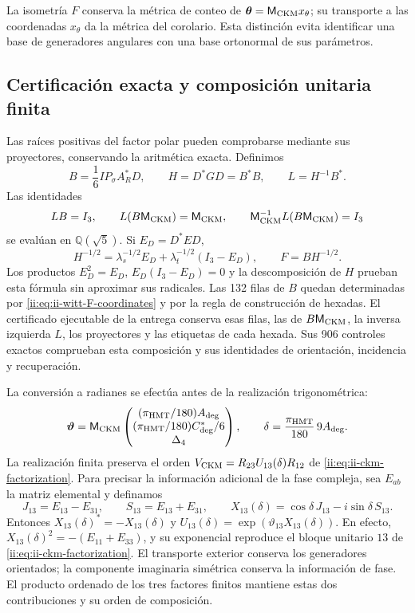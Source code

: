 La isometría \(F\) conserva la métrica de conteo de
\(\boldsymbol\theta=\mathsf M_{\rm CKM}x_\theta\); su transporte
a las coordenadas \(x_\theta\) da la métrica del corolario. Esta
distinción evita identificar una base de generadores angulares con una
base ortonormal de sus parámetros.

\subsection{Certificación exacta y composición unitaria finita}

Las raíces positivas del factor polar pueden comprobarse mediante sus
proyectores, conservando la aritmética exacta. Definimos
\begin{equation}
 B=\frac16IP_\sigma A_R^*D,\qquad
 H=D^*GD=B^*B,\qquad L=H^{-1}B^*.
 \label{ii:eq:ii-witt-radical-free}
\end{equation}
Las identidades
\[
 LB=I_3,\qquad L(B\mathsf M_{\rm CKM})=\mathsf M_{\rm CKM},\qquad
 \mathsf M_{\rm CKM}^{-1}L(B\mathsf M_{\rm CKM})=I_3
\]
se evalúan en \(\mathbb Q(\sqrt5)\). Si \(E_D=D^*ED\),
\[
 H^{-1/2}=\lambda_s^{-1/2}E_D+
          \lambda_t^{-1/2}(I_3-E_D),\qquad F=BH^{-1/2}.
\]
Los productos \(E_D^2=E_D\), \(E_D(I_3-E_D)=0\) y la
descomposición de \(H\) prueban esta fórmula sin aproximar sus
radicales. Las 132 filas de \(B\) quedan determinadas por
\eqref{ii:eq:ii-witt-F-coordinates} y por la regla de construcción de
hexadas. El certificado ejecutable de la entrega conserva esas filas,
las de \(B\mathsf M_{\rm CKM}\), la inversa izquierda \(L\),
los proyectores y las etiquetas de cada hexada. Sus 906 controles
exactos comprueban esta composición y sus identidades de orientación,
incidencia y recuperación.

La conversión a radianes se efectúa antes de la realización trigonométrica:
\begin{equation}
 \boldsymbol\vartheta=
 \mathsf M_{\rm CKM}
 \begin{pmatrix}(\pi_{\rm HMT}/180)A_{\rm deg}\\
 (\pi_{\rm HMT}/180)C^*_{\rm deg}/6\\\Delta_4\end{pmatrix},
 \qquad
 \delta=\frac{\pi_{\rm HMT}}{180}\,9A_{\rm deg}.
 \label{ii:eq:ii-witt-angular-units}
\end{equation}
La realización finita preserva el orden
\(V_{\rm CKM}=R_{23}U_{13}(\delta)R_{12}\) de
\eqref{ii:eq:ii-ckm-factorization}. Para precisar la información adicional
de la fase compleja, sea \(E_{ab}\) la matriz elemental y definamos
\[
 J_{13}=E_{13}-E_{31},\qquad S_{13}=E_{13}+E_{31},\qquad
 X_{13}(\delta)=\cos\delta\,J_{13}-i\sin\delta\,S_{13}.
\]
Entonces \(X_{13}(\delta)^*=-X_{13}(\delta)\) y
\(U_{13}(\delta)=\exp(\vartheta_{13}X_{13}(\delta))\).
En efecto, \(X_{13}(\delta)^2=-(E_{11}+E_{33})\), y su exponencial
reproduce el bloque unitario \(13\) de
\eqref{ii:eq:ii-ckm-factorization}. El transporte exterior conserva los
generadores orientados; la componente imaginaria simétrica conserva
la información de fase. El producto ordenado de los tres factores
finitos mantiene estas dos contribuciones y su orden de composición.

